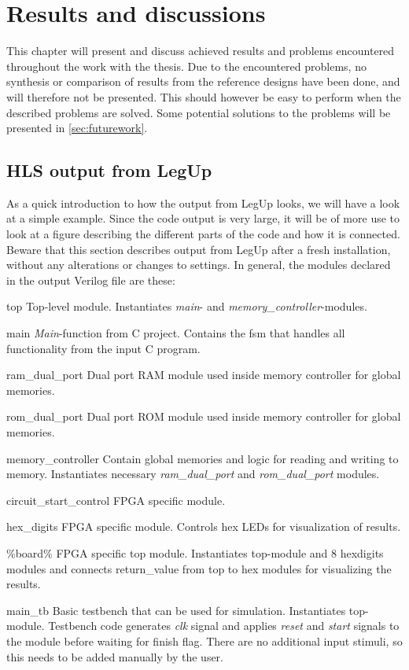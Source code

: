 \chapter{Results and discussions}
\label{chp:resdisc}
This chapter will present and discuss achieved results and problems encountered throughout the work with the thesis. Due to the encountered problems, no synthesis or comparison of results from the reference designs have been done, and will therefore not be presented. This should however be easy to perform when the described problems are solved. Some potential solutions to the problems will be presented in \cref{sec:futurework}.
\section{HLS output from LegUp}
\label{sec:legupoutput}
As a quick introduction to how the output from LegUp looks, we will have a look at a simple example. Since the code output is very large, it will be of more use to look at a figure describing the different parts of the code and how it is connected. Beware that this section describes output from LegUp after a fresh installation, without any alterations or changes to settings. In general, the modules declared in the output Verilog file are these:
\begin{compactdesc}
    \item[top]Top-level module. Instantiates \textit{main}- and \textit{memory\_controller}-modules.
    \item[main]\textit{Main}-function from C project. Contains the \gls{fsm} that handles all functionality from the input C program.
    \item[ram\_dual\_port] Dual port RAM module used inside memory controller for global memories.
    \item[rom\_dual\_port] Dual port ROM module used inside memory controller for global memories.
    \item[memory\_controller]Contain global memories and logic for reading and writing to memory. Instantiates necessary \textit{ram\_dual\_port} and \textit{rom\_dual\_port} modules.
    \item[circuit\_start\_control]FPGA specific module. 
    \item[hex\_digits]FPGA specific module. Controls hex LEDs for visualization of results.
    \item[\%board\%]FPGA specific top module. Instantiates top-module and 8 hex{\textunderscore}digits modules and connects return\_value from top to hex modules for visualizing the results.
    \item[main\_tb]Basic testbench that can be used for simulation. Instantiates top-module. Testbench code generates \textit{clk} signal and applies \textit{reset} and \textit{start} signals to the module before waiting for finish flag. There are no additional input stimuli, so this needs to be added manually by the user.
\end{compactdesc}

